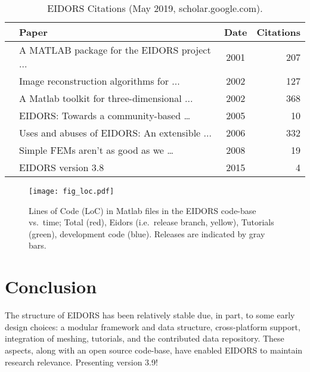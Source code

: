 \documentclass[10pt,letterpaper]{article}
\begin{document}
\begin{multicols}{2}
\begin{table}[H]
  \footnotesize
\centering
\caption{\label{tbl:cite} EIDORS Citations
 (May 2019, scholar.google.com).
}
\begin{tabular}{r@{\hspace{1mm}}lcr}
  \toprule
  & Paper & Date & \hspace{-2mm}Citations \\
  \midrule
  \cite{vauhkonen2001} & A MATLAB package for the EIDORS project {\tiny ...}  
    & 2001 & 207 \\
  \cite{polydorides2002phd} & Image reconstruction algorithms for {\tiny ...}  
    & 2002 & 127 \\
  \cite{polydorides2002matlab} & A Matlab toolkit for three-dimensional {\tiny ...}  
    & 2002 & 368 \\
  \cite{adler2005} & EIDORS: Towards a community-based \ldots
    & 2005 & 10 \\
  \cite{adler2006} & Uses and abuses of {EIDORS}: An extensible {\tiny ...} 
    & 2006 & 332 \\
  \cite{adler2008} & Simple FEMs aren't as good as we \ldots
    & 2008 &  19 \\
  \cite{adler2015} & EIDORS version 3.8
    & 2015 & 4 \\
  \bottomrule
\end{tabular}
\vspace{-1em}
\end{table}

\begin{figure}[H]
  \vspace{-2.5mm}
\centering
 \texttt{[image: fig\_loc.pdf]}
\caption{\label{fig:loc}%
  Lines of Code (LoC) in Matlab files in the EIDORS code-base vs.\ time; Total
   (red), Eidors (i.e.\ release branch, yellow), Tutorials (green), development code (blue).
   Releases are indicated by gray bars.
}
\end{figure}

\section{Conclusion}
The structure of EIDORS has been relatively stable due, in part, to some early design choices:
a modular framework and data structure,
cross-platform support, integration of meshing,
tutorials, and the contributed data repository.
These aspects, along with an open source code-base, have enabled EIDORS to
maintain research relevance.
Presenting version 3.9!



\end{multicols}
\end{document}
